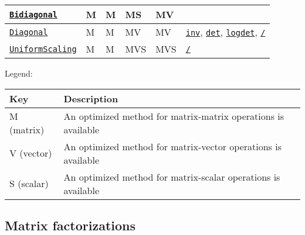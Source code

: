 \begin{table}[h]
\begin{tabulary}{\linewidth}{|L|L|L|L|L|L|}
\hline
\hyperlink{6156150905679680892}{\texttt{Bidiagonal}} & M & M & MS & MV &  \\
\hline
\hyperlink{3300114559258360989}{\texttt{Diagonal}} & M & M & MV & MV & \hyperlink{13336866048543706848}{\texttt{inv}}, \hyperlink{16543378577000914469}{\texttt{det}}, \hyperlink{12765142073947245963}{\texttt{logdet}}, \hyperlink{4103478871488785445}{\texttt{/}} \\
\hline
\hyperlink{723087258311673942}{\texttt{UniformScaling}} & M & M & MVS & MVS & \hyperlink{4103478871488785445}{\texttt{/}} \\
\hline
\end{tabulary}

\end{table}



Legend:




\begin{table}[h]

\begin{tabulary}{\linewidth}{|L|L|}
\hline
Key & Description \\
\hline
M (matrix) & An optimized method for matrix-matrix operations is available \\
\hline
V (vector) & An optimized method for matrix-vector operations is available \\
\hline
S (scalar) & An optimized method for matrix-scalar operations is available \\
\hline
\end{tabulary}

\end{table}



\hypertarget{9743537278285582026}{}


\subsection{Matrix factorizations}




